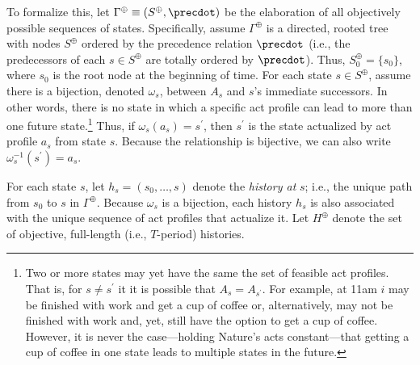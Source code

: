 \documentclass[
11pt,
titlepage,
reqno,
]{article}%
\theoremstyle{definition}
\begin{document}
To formalize this,  let $\Gamma^\oplus\equiv( S^\oplus,\precdot)$ be the elaboration of all objectively possible sequences of states.
Specifically, assume $\Gamma^\oplus$ is a directed, rooted tree with nodes $S^\oplus$ ordered by the precedence relation $\precdot$ (i.e., the predecessors of each $s\in S^\oplus$ are totally ordered by $\precdot$). 
Thus, $S^\oplus_0=\{s_0\}$, where $s_0$ is the root node at the beginning of time.
For each state $s\in S^\oplus$, assume there is a bijection, denoted $\omega_s$, between $A_s$ and $s$'s immediate successors.
In other words, there is no state in which a specific act profile can lead to more than one future state.\footnote
{ 
	Two or more states may yet have the same the set of feasible act profiles. That is, for $s\ne s^\prime$ it it is possible that $A_s=A_{s^\prime}$. For example, at 11am $i$ may be finished with  work and get a cup of coffee or, alternatively, may not be finished with work and, yet, still have the option to get a cup of coffee. However, it is never the case---holding Nature's acts constant---that getting a cup of coffee in one state leads to multiple states in the future.
}
Thus, if $\omega_s(a_s)=s^\prime$, then $s^\prime$ is the state  actualized by act profile $a_s$ from state $s$.
Because the relationship is bijective, we can also write $\omega^{-1}_s(s^\prime)=a_s$. 

For each state $s$, let $h_s=(s_0,\ldots,s)$ denote the \textit{history at} $s$; i.e., the unique path from $s_0$ to $s$ in $\Gamma^\oplus$.
Because $\omega_s$ is a bijection, each history $h_s$ is also associated with the unique sequence of act profiles that actualize it.
Let $H^\oplus$ denote the set of objective, full-length (i.e., $T$-period) histories.
\end{document}
